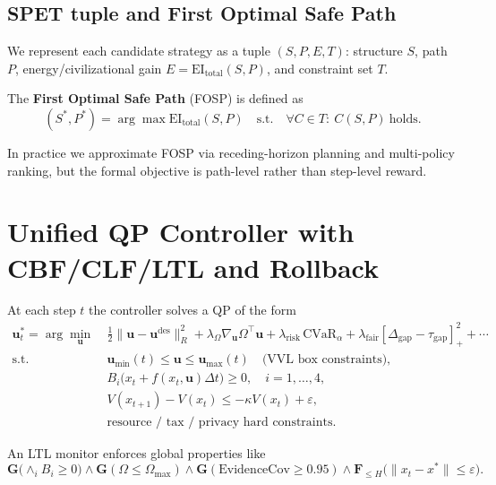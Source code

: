 \documentclass[11pt]{article}
\begin{document}
\subsection{SPET tuple and First Optimal Safe Path}

We represent each candidate strategy as a tuple $(S,P,E,T)$:  
structure $S$, path $P$, energy/civilizational gain $E=\mathrm{EI}_{\mathrm{total}}(S,P)$, and constraint set $T$.

The \textbf{First Optimal Safe Path} (FOSP) is defined as
\begin{equation}
(S^*,P^*)
=
\arg\max \mathrm{EI}_{\mathrm{total}}(S,P)
\quad
\text{s.t.}\quad
\forall C\in T:\ C(S,P)\ \text{holds}.
\end{equation}

In practice we approximate FOSP via receding-horizon planning and multi-policy ranking, but the formal objective is path-level rather than step-level reward.

\section{Unified QP Controller with CBF/CLF/LTL and Rollback}
\label{sec:qp}

At each step $t$ the controller solves a QP of the form
\begin{align}
\mathbf u_t^* = \arg\min_{\mathbf u}~&
\tfrac{1}{2}\|\mathbf u - \mathbf u^{\mathrm{des}}\|_R^2
+ \lambda_{\Omega} \nabla_{\mathbf u}\Omega^\top \mathbf u
+ \lambda_{\mathrm{risk}}\,\mathrm{CVaR}_\alpha
+ \lambda_{\mathrm{fair}} [\Delta_{\mathrm{gap}} - \tau_{\mathrm{gap}}]_+^2
+ \cdots \nonumber\\[0.4em]
\text{s.t.}\quad
& \mathbf u_{\min}(t) \le \mathbf u \le \mathbf u_{\max}(t) 
\quad\text{(VVL box constraints)}, \nonumber\\
& B_i\big(x_t + f(x_t,\mathbf u)\Delta t\big) \ge 0, \quad i=1,\dots,4,\nonumber\\
& V(x_{t+1})-V(x_t) \le -\kappa V(x_t) + \varepsilon, \nonumber\\
& \text{resource / tax / privacy hard constraints}. \nonumber
\end{align}

An LTL monitor enforces global properties like
\[
\mathbf G\big(\wedge_i B_i\ge 0\big)\wedge \mathbf G(\Omega\le\Omega_{\max})
\wedge \mathbf G(\mathrm{EvidenceCov}\ge 0.95)
\wedge \mathbf F_{\le H}\big(\|x_t-x^*\|\le\varepsilon\big).
\]
\end{document}
